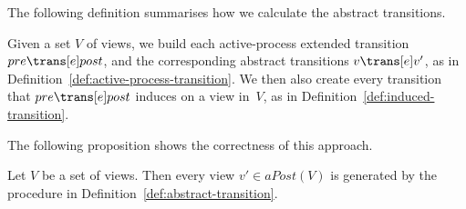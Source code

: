 The following definition summarises how we calculate the abstract transitions.

\begin{definition}
\label{def:abstract-transition}
Given a set $V$ of views, we build each active-process extended transition
$pre \trans[e] post$, and the corresponding abstract transitions $v \trans[e]
v'$, as in Definition~\ref{def:active-process-transition}.
%
We then also create every transition that $pre \trans[e] post$ induces on a
view in~$V$, as in Definition~\ref{def:induced-transition}. 
\end{definition}
%
%

The following proposition shows the correctness of this approach. 


\begin{prop}
\label{prop:abstract-transitions-sound}
Let $V$ be a set of views.  Then every view $v' \in aPost(V)$ is
generated by the procedure in Definition~\ref{def:abstract-transition}.
\end{prop}


